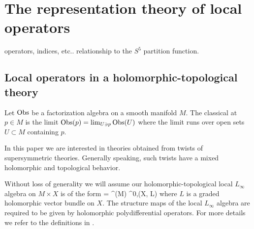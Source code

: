 \documentclass[11pt]{amsart}
\begin{document}
\section{The representation theory of local operators}

operators, indices, etc..
relationship to the $S^5$ partition function.

\subsection{Local operators in a holomorphic-topological theory}

\begin{dfn} 
Let $\operatorname{Obs}$ be a factorization algebra on a smooth manifold $M$.
The classical  at $p \in M$ is the limit $\operatorname{Obs}(p) = \lim_{U \ni p} \operatorname{Obs}(U)$ where the limit runs over open sets $U \subset M$ containing $p$.
\end{dfn}

\parsec[]

In this paper we are interested in theories obtained from twists of supersymmetric theories. 
Generally speaking, such twists have a mixed holomorphic and topological behavior.
%
%

Without loss of generality we will assume our holomorphic-topological local $L_\infty$ algebra on $M \times X$ is of the form
\beqn\label{eqn:cL}
\cL = \Omega^\bu (M) \hotimes \Omega^{0,\bu}(X, L) 
\eeqn
where $L$ is a graded holomorphic vector bundle on $X$.
The structure maps of the local $L_\infty$ algebra are required to be given by holomorphic polydifferential operators. 
For more details we refer to the definitions in \cite{GRWthf}.
\end{document}
